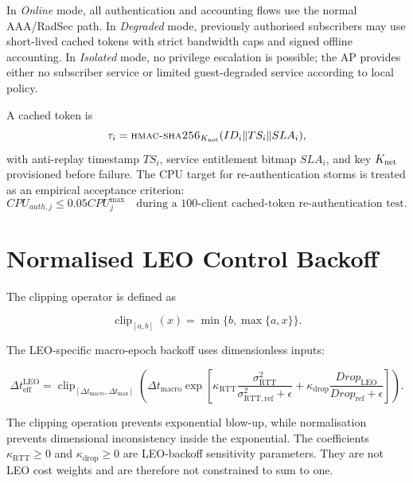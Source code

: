In \emph{Online} mode, all authentication and accounting flows use the normal AAA/RadSec path. In \emph{Degraded} mode, previously authorised subscribers may use short-lived cached tokens with strict bandwidth caps and signed offline accounting. In \emph{Isolated} mode, no privilege escalation is possible; the AP provides either no subscriber service or limited guest-degraded service according to local policy.

A cached token is
\begin{equation}
  \tau_i=\textsc{hmac-sha256}{}_{K_{\mathrm{net}}}(ID_i\|TS_i\|SLA_i),
  \label{eq:hmac-token}
\end{equation}
with anti-replay timestamp $TS_i$, service entitlement bitmap $SLA_i$, and key $K_{\mathrm{net}}{}$ provisioned before failure. The CPU target for re-authentication storms is treated as an empirical acceptance criterion:
\begin{equation}
  CPU_{auth,j}\leq0.05CPU_j^{\max}
  \quad \text{during a 100-client cached-token re-authentication test.}
  \label{eq:hmac-cpu-criterion}
\end{equation}

\section{Normalised LEO Control Backoff}
\label{sec:leo-backoff}

The clipping operator is defined as

\begin{equation}
\operatorname{clip}_{[a,b]}(x)
=
\min\{b,\max\{a,x\}\}.
\label{eq:clip-definition}
\end{equation}

The LEO-specific macro-epoch backoff uses dimensionless inputs:

\begin{equation}
\Delta t_{\mathrm{eff}}^{\mathrm{LEO}}
=
\operatorname{clip}_{[\Delta t_{\mathrm{macro}},\Delta t_{\max}]}
\left(
\Delta t_{\mathrm{macro}}
\exp
\left[
\kappa_{\mathrm{RTT}}
\frac{\sigma^2_{\mathrm{RTT}}}{\sigma^2_{\mathrm{RTT,ref}}+\epsilon}
+
\kappa_{\mathrm{drop}}
\frac{Drop_{\mathrm{LEO}}}{Drop_{\mathrm{ref}}+\epsilon}
\right]
\right).
\label{eq:leo-backoff-clean}
\end{equation}

The clipping operation prevents exponential blow-up, while normalisation
prevents dimensional inconsistency inside the exponential. The coefficients
$\kappa_{\mathrm{RTT}}\geq0$ and $\kappa_{\mathrm{drop}}\geq0$ are LEO-backoff
sensitivity parameters. They are not LEO cost weights and are therefore not
constrained to sum to one.

